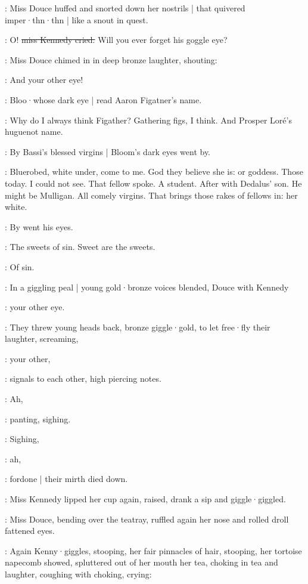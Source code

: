:
Miss Douce huffed and snorted down her nostrils |
that quivered imper·thn·thn |
like a snout in quest.

\MissK:
O!
\stage{[shrieking]}
\sout{miss Kennedy cried.}
Will you ever forget his goggle eye?

:
Miss Douce chimed in in deep bronze laughter,
shouting:

\MissD:
And your other eye!

:
Bloo·whose dark eye |
read Aaron Figatner's name.

\BloomInt:
Why do I always think Figather?
Gathering figs,
I think.
And Prosper Loré's huguenot name.

:
By Bassi's blessed virgins |
Bloom's dark eyes went by.

\BloomInt:
Bluerobed,
white under,
come to me.
God they believe she is:
or goddess.
Those today.
I could not see.
That fellow spoke.
A student.
After with Dedalus' son.
He might be Mulligan.
All comely virgins.
That brings those rakes of fellows in:
her white.

:
By went his eyes.

\BloomInt:
The sweets of sin.
Sweet are the sweets.

:
Of sin.

:
In a giggling peal |
young gold·bronze voices blended,
Douce with Kennedy

\MissesDK:
your other eye.

:
They threw young heads back,
bronze giggle·gold,
to let free·fly their laughter,
screaming,

\MissesDK:
your other,

:
signals to each other,
high piercing notes.

\MissesDK:
Ah,

:
panting,
sighing.

:
Sighing,

\MissesDK:
ah,

:
fordone |
their mirth died down.

:
Miss Kennedy lipped her cup again,
raised,
drank a sip and giggle·giggled.

:
Miss Douce,
bending over the teatray,
ruffled again her nose
and rolled droll fattened eyes.

:
Again Kenny·giggles,
stooping,
her fair pinnacles of hair,
stooping,
her tortoise napecomb showed,
spluttered out of her mouth her tea,
choking in tea and laughter,
coughing with choking,
crying:

